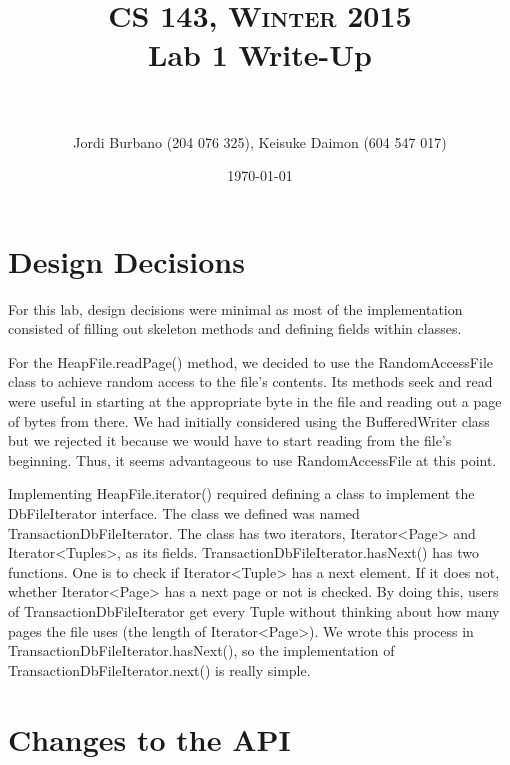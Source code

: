 \documentclass[paper=a4, fontsize=11pt]{scrartcl} %
\title{	
\normalfont \normalsize \textsc{CS 143, Winter 2015}
\horrule{0.5pt} \\[0.4cm] %
\huge Lab 1 Write-Up \\ %
\horrule{2pt} \\[0.5cm] %
}
\author{Jordi Burbano (204 076 325), Keisuke Daimon (604 547 017)} %
\date{\normalsize\today} %
\numberwithin{equation}{section} %
\numberwithin{figure}{section} %
\numberwithin{table}{section} %
\begin{document}
\maketitle %


\section{Design Decisions}

For this lab, design decisions were minimal as most of the implementation consisted of filling out skeleton methods and defining fields within classes.

For the HeapFile.readPage() method, we decided to use the RandomAccessFile class to achieve random access to the file's contents. Its methods seek and read were useful in starting at the appropriate byte in the file and reading out a page of bytes from there. We had initially considered using the BufferedWriter class but we rejected it because we would have to start reading from the file's beginning. Thus, it seems advantageous to use RandomAccessFile at this point.

Implementing HeapFile.iterator() required defining a class to implement the DbFileIterator interface. The class we defined was named TransactionDbFileIterator. The class has two iterators, Iterator<Page> and Iterator<Tuples>, as its fields. TransactionDbFileIterator.hasNext() has two functions. One is to check if Iterator<Tuple> has a next element. If it does not, whether Iterator<Page> has a next page or not is checked. By doing this, users of TransactionDbFileIterator get every Tuple without thinking about how many pages the file uses (the length of Iterator<Page>). We wrote this process in TransactionDbFileIterator.hasNext(), so the implementation of TransactionDbFileIterator.next() is really simple.




\section{Changes to the API}
\end{document}
